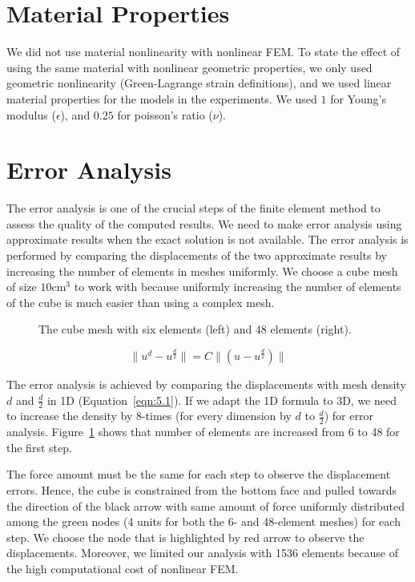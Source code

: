 \section{Material Properties}

We did not use material nonlinearity with nonlinear FEM. To state the effect of using the same material with nonlinear geometric properties, we only used geometric nonlinearity (Green-Lagrange strain definitions), and we used linear material properties for the models in the experiments. We used $1$ for Young's modulus ($\epsilon$), and $0.25$ for poisson's ratio ($\nu$).

\section{Error Analysis}

The error analysis is one of the crucial steps of the finite element method to assess the quality of the computed results. We need to make error analysis using approximate results when the exact solution is not available. The error analysis is performed by comparing the displacements of the two approximate results by increasing the number of elements in meshes uniformly. We choose a cube mesh of size $10$cm$^{3}$ to work with because uniformly increasing the number of elements of the cube is much easier than using a complex mesh.

\begin{figure}[htb]
\centerline{}
\caption{The cube mesh with six elements (left) and 48 elements (right).}
\label{fig:denser}
\end{figure}

\begin{equation}
\parallel u^d - u^{\frac{d}{2}}\parallel = C \parallel (u - u^{\frac{d}{2}}) \parallel
\label{eqn:5.1}
\end{equation}

The error analysis is achieved by comparing the displacements with mesh density $d$ and $\frac{d}{2}$ in 1D (Equation~\ref{eqn:5.1}). If we adapt the 1D formula to 3D, we need to increase the density by 8-times (for every dimension by $d$ to $\frac{d}{2}$) for error analysis. Figure~\ref{fig:denser} shows that number of elements are increased from 6 to 48 for the first step.

The force amount must be the same for each step to observe the displacement errors. Hence, the cube is constrained from the bottom face and pulled towards the direction of the black arrow with same amount of force uniformly distributed among the green nodes (4 units for both the 6- and 48-element meshes) for each step. We choose the node that is highlighted by red arrow to observe the displacements. Moreover, we limited our analysis with 1536 elements because of the high computational cost of nonlinear FEM.

